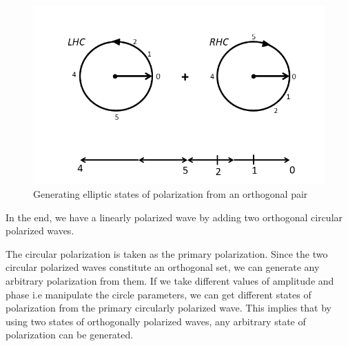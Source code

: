 \begin{figure}[h]
	\centering
	\includegraphics[width=1\linewidth]{"./graphics/generatingEP"}
	\caption{Generating elliptic states of polarization from an orthogonal pair}
	\label{fig:linear-polarized}
\end{figure}

In the end, we have a linearly polarized wave by adding two orthogonal circular polarized waves.

The circular polarization is taken as the primary polarization. Since the two circular polarized waves constitute an orthogonal set, we can generate any arbitrary polarization from them. If we take different values of amplitude and phase i.e manipulate the circle parameters, we can get different states of polarization from the primary circularly polarized wave. This implies that by using two states of orthogonally polarized waves, any arbitrary state of polarization can be generated.


